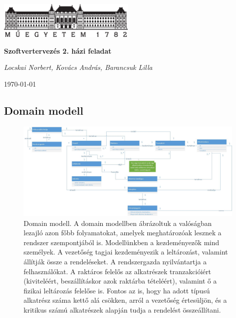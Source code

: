 \documentclass[12pt]{article}\usepackage[left=20mm,right=20mm,top=15mm,bottom=20mm]{geometry}
\begin{document}
\begin{titlepage}
\centering
	\includegraphics[width=0.5\textwidth]{figures/bme_logo_kicsi.eps}\par\vspace{1cm}
	\vspace{1cm}
	\vspace{1.5cm}
	{\huge\bfseries Szoftvertervezés 2. házi feladat \par}
	\vspace{15cm}
	{\huge\itshape Locskai Norbert, Kovács András, Barancsuk Lilla \par}
	\vfill

	{\large \today\par}
\end{titlepage}

\thispagestyle{empty}
\begin{landscape}
\section{Domain modell}
\begin{figure}[!h]
    \centering
        \includegraphics[width=1.4\textwidth]{kepek/Domain_model.jpg}
        \caption{Domain modell. A domain modellben ábrázoltuk a valóságban lezajló azon főbb folyamatokat, amelyek meghatározóak lesznek a rendszer szempontjából is. Modellünkben a kezdeményezők mind személyek.
A vezetőség tagjai kezdeményezik a leltározást, valamint állítják össze a rendeléseket.
A rendszergazda nyilvántartja a felhasználókat.
A raktáros felelős az alkatrészek tranzakcióiért (kiviteléért, beszállításkor azok raktárba tételéért), valamint ő a fizikai leltározás felelőse is. 
Fontos az is, hogy ha adott típusú alkatrész száma kettő alá csökken, arról a vezetőség értesüljön, és a kritikus számú alkatrészek alapján tudja a rendelést összeállítani.}
\end{figure}
\end{landscape}
\end{document}
